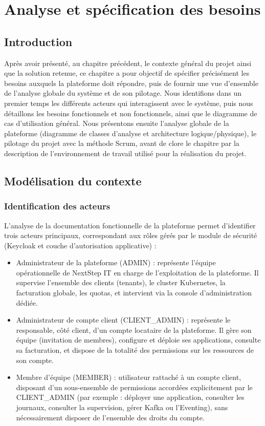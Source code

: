 \chapter{Analyse et spécification des besoins}

\section{Introduction}

Après avoir présenté, au chapitre précédent, le contexte général du projet ainsi que la solution retenue, ce chapitre a pour objectif de spécifier précisément les besoins auxquels la plateforme doit répondre, puis de fournir une vue d'ensemble de l'analyse globale du système et de son pilotage. Nous identifions dans un premier temps les différents acteurs qui interagissent avec le système, puis nous détaillons les besoins fonctionnels et non fonctionnels, ainsi que le diagramme de cas d'utilisation général. Nous présentons ensuite l'analyse globale de la plateforme (diagramme de classes d'analyse et architecture logique/physique), le pilotage du projet avec la méthode Scrum, avant de clore le chapitre par la description de l'environnement de travail utilisé pour la réalisation du projet.

\section{Modélisation du contexte}

\subsection{Identification des acteurs}

L'analyse de la documentation fonctionnelle de la plateforme permet d'identifier trois acteurs principaux, correspondant aux rôles gérés par le module de sécurité (Keycloak et couche d'autorisation applicative) :

\begin{itemize}[label=--]
\item Administrateur de la plateforme (ADMIN) : représente l'équipe opérationnelle de NextStep IT en charge de l'exploitation de la plateforme. Il supervise l'ensemble des clients (tenants), le cluster Kubernetes, la facturation globale, les quotas, et intervient via la console d'administration dédiée.

\item Administrateur de compte client (CLIENT\_ADMIN) : représente le responsable, côté client, d'un compte locataire de la plateforme. Il gère son équipe (invitation de membres), configure et déploie ses applications, consulte sa facturation, et dispose de la totalité des permissions sur les ressources de son compte.

\item Membre d'équipe (MEMBER) : utilisateur rattaché à un compte client, disposant d'un sous-ensemble de permissions accordées explicitement par le CLIENT\_ADMIN (par exemple : déployer une application, consulter les journaux, consulter la supervision, gérer Kafka ou l'Eventing), sans nécessairement disposer de l'ensemble des droits du compte.
\end{itemize}

